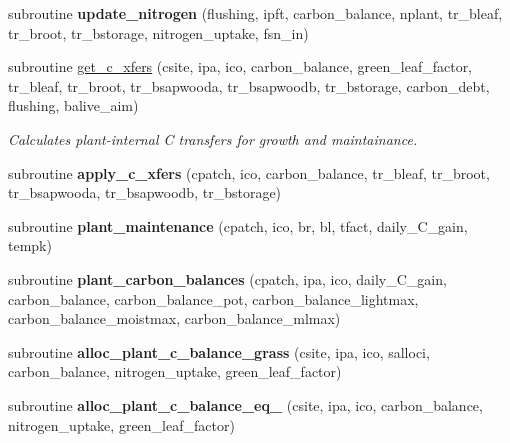 \begin{DoxyCompactItemize}
\item 
\hypertarget{namespacegrowth__balive_a8599682ade194a107377a540d7e64c73}{
subroutine {\bfseries update\_\-nitrogen} (flushing, ipft, carbon\_\-balance, nplant, tr\_\-bleaf, tr\_\-broot, tr\_\-bstorage, nitrogen\_\-uptake, fsn\_\-in)}
\label{namespacegrowth__balive_a8599682ade194a107377a540d7e64c73}

\item 
subroutine \hyperlink{namespacegrowth__balive_a4a738e1e648a3932ae0beb2400c9bf78}{get\_\-c\_\-xfers} (csite, ipa, ico, carbon\_\-balance, green\_\-leaf\_\-factor, tr\_\-bleaf, tr\_\-broot, tr\_\-bsapwooda, tr\_\-bsapwoodb, tr\_\-bstorage, carbon\_\-debt, flushing, balive\_\-aim)
\begin{DoxyCompactList}\small\item\em Calculates plant-\/internal C transfers for growth and maintainance. \item\end{DoxyCompactList}\item 
\hypertarget{namespacegrowth__balive_a7a91aeb819248834373b9c7d9bafcbde}{
subroutine {\bfseries apply\_\-c\_\-xfers} (cpatch, ico, carbon\_\-balance, tr\_\-bleaf, tr\_\-broot, tr\_\-bsapwooda, tr\_\-bsapwoodb, tr\_\-bstorage)}
\label{namespacegrowth__balive_a7a91aeb819248834373b9c7d9bafcbde}

\item 
\hypertarget{namespacegrowth__balive_af977e6b599dfde9155a3ab3cb7175f16}{
subroutine {\bfseries plant\_\-maintenance} (cpatch, ico, br, bl, tfact, daily\_\-C\_\-gain, tempk)}
\label{namespacegrowth__balive_af977e6b599dfde9155a3ab3cb7175f16}

\item 
\hypertarget{namespacegrowth__balive_a7921154a300d0b56c862c78f641e5d3b}{
subroutine {\bfseries plant\_\-carbon\_\-balances} (cpatch, ipa, ico, daily\_\-C\_\-gain, carbon\_\-balance, carbon\_\-balance\_\-pot, carbon\_\-balance\_\-lightmax, carbon\_\-balance\_\-moistmax, carbon\_\-balance\_\-mlmax)}
\label{namespacegrowth__balive_a7921154a300d0b56c862c78f641e5d3b}

\item 
\hypertarget{namespacegrowth__balive_aade95a53fd0d26aabf864afab17b1889}{
subroutine {\bfseries alloc\_\-plant\_\-c\_\-balance\_\-grass} (csite, ipa, ico, salloci, carbon\_\-balance, nitrogen\_\-uptake, green\_\-leaf\_\-factor)}
\label{namespacegrowth__balive_aade95a53fd0d26aabf864afab17b1889}

\item 
\hypertarget{namespacegrowth__balive_abc5121207b9e02b869996c48e1204381}{
subroutine {\bfseries alloc\_\-plant\_\-c\_\-balance\_\-eq\_} (csite, ipa, ico, carbon\_\-balance, nitrogen\_\-uptake, green\_\-leaf\_\-factor)}
\label{namespacegrowth__balive_abc5121207b9e02b869996c48e1204381}


\end{DoxyCompactItemize}
